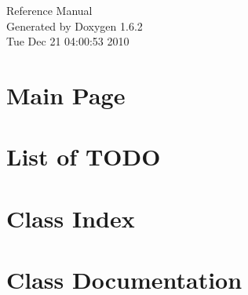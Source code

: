 \documentclass[a4paper]{book}
\begin{document}
\hypersetup{pageanchor=false}
\begin{titlepage}
\vspace*{7cm}
\begin{center}
{\Large Reference Manual}\\
\vspace*{1cm}
{\large Generated by Doxygen 1.6.2}\\
\vspace*{0.5cm}
{\small Tue Dec 21 04:00:53 2010}\\
\end{center}
\end{titlepage}
\clearemptydoublepage
{}
\tableofcontents
\clearemptydoublepage
{}
\hypersetup{pageanchor=true}
\chapter{Main Page}
\label{index}\hypertarget{index}{}
\chapter{List of TODO}
\label{todo}
\hypertarget{todo}{}

\chapter{Class Index}

\chapter{Class Documentation}


















\printindex
\end{document}
